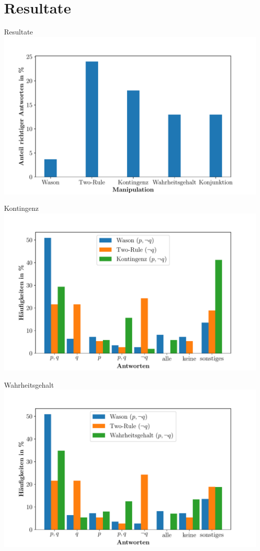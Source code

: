 
\section{Resultate}

\begin{frame}{Resultate}
    \includegraphics[width=\textwidth]{../plot/results_correct.pdf}
\end{frame}


\begin{frame}{Kontingenz}
    \includegraphics[width=\textwidth]{../plot/results_contingency.pdf}
\end{frame}


\begin{frame}{Wahrheitsgehalt}
    \includegraphics[width=\textwidth]{../plot/results_truthfulness.pdf}
\end{frame}


